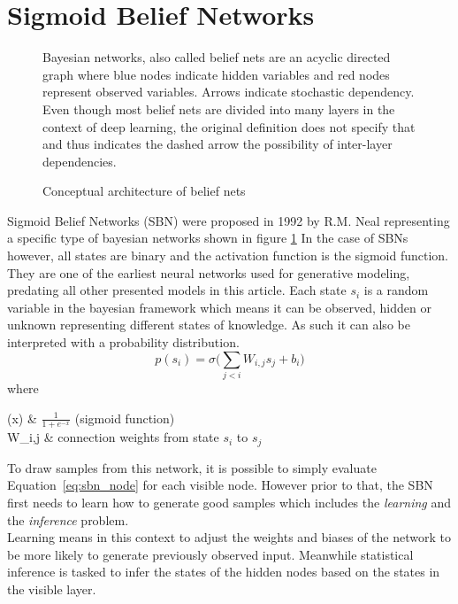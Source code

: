 \section{Sigmoid Belief Networks}
\label{sec:sbn}
\begin{figure}[htb]
\centering

  \caption[Architecture of Sigmoid Belief Nets]{Conceptual architecture of belief nets}
  \label{fig:sbn_arch}
  \medskip
  \small
  Bayesian networks, also called belief nets are an acyclic directed graph where blue nodes indicate hidden variables and red nodes represent observed variables.
  Arrows indicate stochastic dependency.
  Even though most belief nets are divided into many layers in the context of deep learning, the original definition does not specify that and thus indicates the dashed arrow the possibility of inter-layer dependencies.
\end{figure}

Sigmoid Belief Networks (SBN) were proposed in 1992 by R.M. Neal \cite{neal:1992} representing a specific type of bayesian networks \cite{pearl:1985} shown in figure \ref{fig:sbn_arch}
In the case of SBNs however, all states are binary and the activation function is the sigmoid function. They are one of the earliest neural networks used for generative modeling, predating all other presented models in this article.
Each state $s_i$ is a random variable in the bayesian framework which means it can be observed, hidden or unknown representing different states of knowledge. As such it can also be interpreted with a probability distribution.
\begin{equation}
  \label{eq:sbn_node}
p(s_i) = \sigma\bigg(\sum_{j<i}W_{i,j}s_j+b_i\bigg)
\end{equation}
where 
\begin{conditions}
  \sigma(x) & $\frac{1}{1 + e^{-x}}$ (sigmoid function)\\
  W_{i,j} & connection weights from state $s_i$ to $s_j$\\
\end{conditions}

To draw samples from this network, it is possible to simply evaluate Equation~\ref{eq:sbn_node} for each visible node.
However prior to that, the SBN first needs to learn how to generate good samples which includes the \emph{learning} and the \emph{inference} problem.\\
Learning means in this context to adjust the weights and biases of the network to be more likely to generate previously observed input.
Meanwhile statistical inference is tasked to infer the states of the hidden nodes based on the states in the visible layer.\\

